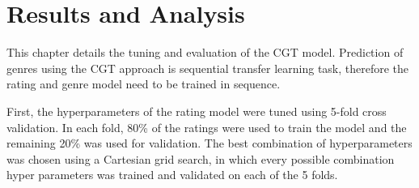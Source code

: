 \chapter{Results and Analysis}
\label{results}

This chapter details the tuning and evaluation of the CGT model. Prediction of genres using the CGT approach is sequential transfer learning task, therefore the rating and genre model need to be trained in sequence.

First, the hyperparameters of the rating model were tuned using 5-fold cross validation. In each fold, 80\% of the ratings were used to train the model and the remaining 20\% was used for validation. The best combination of hyperparameters was chosen using a Cartesian grid search, in which every possible combination hyper parameters was trained and validated on each of the 5 folds.